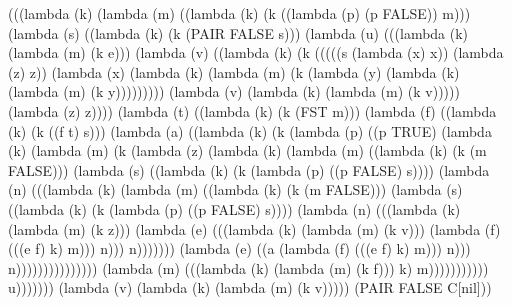 \documentclass[ms,electronic,twosidetoc,letterpaper,chaptercenter,parttop]{byumsphd}
\begin{document}
\begin{theorem}
\begin{schemedisplay}
(((lambda (k) (lambda (m) ((lambda (k) (k ((lambda (p) (p FALSE)) m)))
               (lambda (s) ((lambda (k) (k (PAIR FALSE s)))
                      (lambda (u) (((lambda (k) (lambda (m) (k e)))
                              (lambda (v) ((lambda (k) (k (((((s (lambda (x) x)) (lambda (z) z))
                                                 (lambda (x) (lambda (k) (lambda (m) (k (lambda (y) (lambda (k) (lambda (m) (k y)))))))))
                                                (lambda (v) (lambda (k) (lambda (m) (k v))))) (lambda (z) z))))
                                     (lambda (t) ((lambda (k) (k (FST m)))
                                            (lambda (f) ((lambda (k) (k ((f t) s)))
                                                   (lambda (a) ((lambda (k) (k (lambda (p) ((p TRUE)
                                                                          (lambda (k) (lambda (m) (k (lambda (z) (lambda (k) (lambda (m) ((lambda (k) (k (m FALSE)))
                                                                                                            (lambda (s) ((lambda (k) (k (lambda (p) ((p FALSE) s))))
                                                                                                                   (lambda (n) (((lambda (k) (lambda (m) ((lambda (k) (k (m FALSE)))
                                                                                                                                        (lambda (s) ((lambda (k) (k (lambda (p) ((p FALSE) s))))
                                                                                                                                               (lambda (n) (((lambda (k) (lambda (m) (k z)))
                                                                                                                                                       (lambda (e) (((lambda (k) (lambda (m) (k v)))
                                                                                                                                                               (lambda (f) (((e f) k) m))) n))) n)))))))
                                                                                                                           (lambda (e) ((a (lambda (f) (((e f) k) m))) n))) n)))))))))))))))
                                                          (lambda (m) (((lambda (k) (lambda (m) (k f))) k) m))))))))))) u)))))))
  (lambda (v) (lambda (k) (lambda (m) (k v)))))
 (PAIR FALSE C[nil]))
\end{schemedisplay}



\end{theorem}
\end{document}
